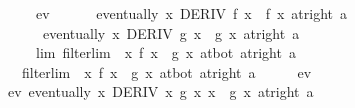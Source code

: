 \begin{isabellebody}
\ \ \ \ \ ev{\isacharcolon}{\kern0pt}\isanewline
\ \ \ \ \ \ {\isachardoublequoteopen}eventually\ {\isacharparenleft}{\kern0pt}{\isasymlambda}x{\isachardot}{\kern0pt}\ DERIV\ f\ x\ {\isacharcolon}{\kern0pt}{\isachargreater}{\kern0pt}\ f{\isacharprime}{\kern0pt}\ x{\isacharparenright}{\kern0pt}\ {\isacharparenleft}{\kern0pt}at{\isacharunderscore}{\kern0pt}right\ a{\isacharparenright}{\kern0pt}{\isachardoublequoteclose}\isanewline
\ \ \ \ \ \ {\isachardoublequoteopen}eventually\ {\isacharparenleft}{\kern0pt}{\isasymlambda}x{\isachardot}{\kern0pt}\ DERIV\ g\ x\ {\isacharcolon}{\kern0pt}{\isachargreater}{\kern0pt}\ g{\isacharprime}{\kern0pt}\ x{\isacharparenright}{\kern0pt}\ {\isacharparenleft}{\kern0pt}at{\isacharunderscore}{\kern0pt}right\ a{\isacharparenright}{\kern0pt}{\isachardoublequoteclose}\isanewline
\ \ \ \ \ lim{\isacharcolon}{\kern0pt}\ {\isachardoublequoteopen}filterlim\ {\isacharparenleft}{\kern0pt}{\isasymlambda}\ x{\isachardot}{\kern0pt}\ {\isacharparenleft}{\kern0pt}f{\isacharprime}{\kern0pt}\ x\ {\isacharslash}{\kern0pt}\ g{\isacharprime}{\kern0pt}\ x{\isacharparenright}{\kern0pt}{\isacharparenright}{\kern0pt}\ at{\isacharunderscore}{\kern0pt}bot\ {\isacharparenleft}{\kern0pt}at{\isacharunderscore}{\kern0pt}right\ a{\isacharparenright}{\kern0pt}{\isachardoublequoteclose}\isanewline
\ \ \ {\isachardoublequoteopen}filterlim\ {\isacharparenleft}{\kern0pt}{\isasymlambda}\ x{\isachardot}{\kern0pt}\ f\ x\ {\isacharslash}{\kern0pt}\ g\ x{\isacharparenright}{\kern0pt}\ at{\isacharunderscore}{\kern0pt}bot\ {\isacharparenleft}{\kern0pt}at{\isacharunderscore}{\kern0pt}right\ a{\isacharparenright}{\kern0pt}{\isachardoublequoteclose}\isanewline
%
\isadelimproof
%
\endisadelimproof
%
\isatagproof
{}\isamarkupfalse%
\ {\isacharminus}{\kern0pt}\isanewline
\ \ \isamarkupfalse%
\ ev{\isacharparenleft}{\kern0pt}{}{\isacharparenright}{\kern0pt}\ \isamarkupfalse%
\ ev{\isacharprime}{\kern0pt}{\isacharcolon}{\kern0pt}\ {\isachardoublequoteopen}eventually\ {\isacharparenleft}{\kern0pt}{\isasymlambda}x{\isachardot}{\kern0pt}\ DERIV\ {\isacharparenleft}{\kern0pt}{\isasymlambda}x{\isachardot}{\kern0pt}\ {\isacharminus}{\kern0pt}g\ x{\isacharparenright}{\kern0pt}\ x\ {\isacharcolon}{\kern0pt}{\isachargreater}{\kern0pt}\ {\isacharminus}{\kern0pt}g{\isacharprime}{\kern0pt}\ x{\isacharparenright}{\kern0pt}\ {\isacharparenleft}{\kern0pt}at{\isacharunderscore}{\kern0pt}right\ a{\isacharparenright}{\kern0pt}{\isachardoublequoteclose}\isanewline
\ \ \ \ \isamarkupfalse%

\end{isabellebody}
